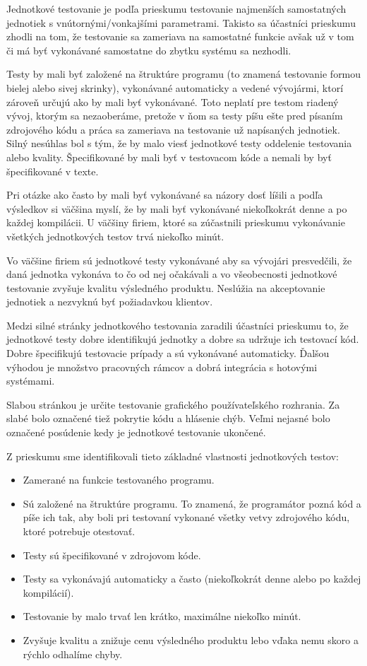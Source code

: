 \documentclass[11pt,twoside,slovak,a4paper]{article}
\begin{document}
	Jednotkové testovanie je podľa prieskumu testovanie najmenších samostatných jednotiek s vnútornými/vonkajšími parametrami. Takisto sa účastníci prieskumu zhodli na tom, že testovanie sa zameriava na samostatné funkcie avšak už v tom či má byť vykonávané samostatne do zbytku systému sa nezhodli.
	
	Testy by mali byť založené na štruktúre programu (to znamená testovanie formou bielej alebo sivej skrinky), vykonávané automaticky a vedené vývojármi, ktorí zároveň určujú ako by mali byť vykonávané. Toto neplatí pre testom riadený vývoj, ktorým sa nezaoberáme, pretože v ňom sa testy píšu ešte pred písaním zdrojového kódu a práca sa zameriava na testovanie už napísaných jednotiek. Silný nesúhlas bol s tým, že by malo viesť jednotkové testy oddelenie testovania alebo kvality. Špecifikované by mali byť v testovacom kóde a nemali by byť špecifikované v texte.
	
	Pri otázke ako často by mali byť vykonávané sa názory dosť líšili a podľa výsledkov si väčšina myslí, že by mali byť vykonávané niekoľkokrát denne a po každej kompilácii. U väčšiny firiem, ktoré sa zúčastnili prieskumu vykonávanie všetkých jednotkových testov trvá niekoľko minút.
	
	Vo väčšine firiem sú jednotkové testy vykonávané aby sa vývojári presvedčili, že daná jednotka vykonáva to čo od nej očakávali a vo všeobecnosti jednotkové testovanie zvyšuje kvalitu výsledného produktu. Neslúžia na akceptovanie jednotiek a nezvyknú byť požiadavkou klientov.
	
	Medzi silné stránky jednotkového testovania zaradili účastníci prieskumu to, že jednotkové testy dobre identifikujú jednotky a dobre sa udržuje ich testovací kód. Dobre špecifikujú testovacie prípady a sú vykonávané automaticky. Ďalšou výhodou je množstvo pracovných rámcov a dobrá integrácia s hotovými systémami.
	
	Slabou stránkou je určite testovanie grafického používateľského rozhrania. Za slabé bolo označené tiež pokrytie kódu a hlásenie chýb. Veľmi nejasné bolo označené posúdenie kedy je jednotkové testovanie ukončené.\newline
	
	
	Z prieskumu\cite{Runeson2006} sme identifikovali tieto základné vlastnosti jednotkových testov:
		\begin{itemize}
			\item Zamerané na funkcie testovaného programu.
			\item Sú založené na štruktúre programu. To znamená, že programátor pozná kód a píše ich tak, aby boli pri testovaní vykonané všetky vetvy zdrojového kódu, ktoré potrebuje otestovať.
			\item Testy sú špecifikované v zdrojovom kóde.
			\item Testy sa vykonávajú automaticky a často (niekoľkokrát denne alebo po každej kompilácií).
			\item Testovanie by malo trvať len krátko, maximálne niekoľko minút.
			\item Zvyšuje kvalitu a znižuje cenu výsledného produktu lebo vďaka nemu skoro a rýchlo odhalíme chyby.
		\end{itemize}
		
\end{document}
